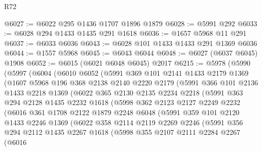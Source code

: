 \begin{lexlean}{R72}
\begin{coremodule}
@6027 := @6022 @295 @1436 @1707 @1896 @1879
@6028 := @5991 @292
@6033 := @6028 @294 @1433 @1435 @291 @1618
@6036 := @1657 @5968 @11 @291
@6037 := @6033 @6036
@6043 := @6028 @101 @1433 @1433 @291 @1369 @6036
@6044 := @1557 @5968
@6045 := @6043 @6044
@6048 := @6027 (@6037 @6045) @1908
@6052 := @6015 (@6021 @6048 @6045) @2017
@6215 := @5978
    (@5990
      (@5997
        (@6004
          (@6010
            @6052
            (@5991
              @369
              @101
              @2141
              @1433
              @2179
              @1369
              (@1607
                @5968
                @196
                @368
                @2138
                @2140
                @2220
                @2179
                (@5991
                  @366
                  @101
                  @2136
                  @1433
                  @2218
                  @1369
                  (@6022
                    @365
                    @2130
                    @2135
                    @2234
                    @2218
                    (@5991
                      @363
                      @294
                      @2128
                      @1435
                      @2232
                      @1618
                      (@5998
                        @362
                        @2123
                        @2127
                        @2249
                        @2232
                        (@6016
                          @361
                          @1708
                          @2122
                          @1879
                          @2248
                          @6048
                          (@5991
                            @359
                            @101
                            @2120
                            @1433
                            @2246
                            @1369
                            (@6022
                              @358
                              @2114
                              @2119
                              @2269
                              @2246
                              (@5991
                                @356
                                @294
                                @2112
                                @1435
                                @2267
                                @1618
                                (@5998
                                  @355
                                  @2107
                                  @2111
                                  @2284
                                  @2267
                                  (@6016

\end{coremodule}
\end{lexlean}
